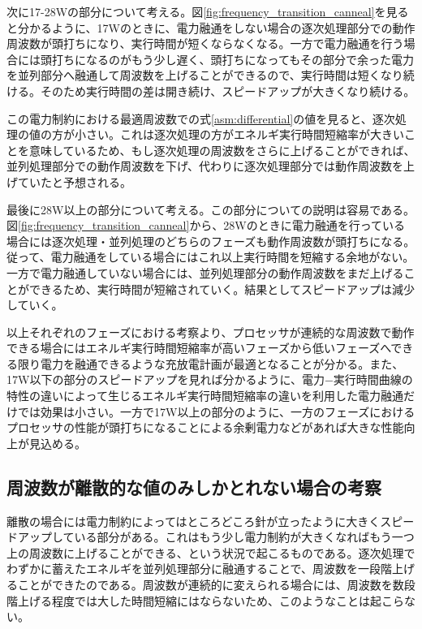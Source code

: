 次に17-28Wの部分について考える。図\ref{fig:frequency_transition_canneal}を見ると分かるように、17Wのときに、電力融通をしない場合の逐次処理部分での動作周波数が頭打ちになり、実行時間が短くならなくなる。一方で電力融通を行う場合には頭打ちになるのがもう少し遅く、頭打ちになってもその部分で余った電力を並列部分へ融通して周波数を上げることができるので、実行時間は短くなり続ける。そのため実行時間の差は開き続け、スピードアップが大きくなり続ける。

この電力制約における最適周波数での式\ref{asm:differential}の値を見ると、逐次処理の値の方が小さい。これは逐次処理の方がエネルギ実行時間短縮率が大きいことを意味しているため、もし逐次処理の周波数をさらに上げることができれば、並列処理部分での動作周波数を下げ、代わりに逐次処理部分では動作周波数を上げていたと予想される。

最後に28W以上の部分について考える。この部分についての説明は容易である。図\ref{fig:frequency_transition_canneal}から、28Wのときに電力融通を行っている場合には逐次処理・並列処理のどちらのフェーズも動作周波数が頭打ちになる。従って、電力融通をしている場合にはこれ以上実行時間を短縮する余地がない。一方で電力融通していない場合には、並列処理部分の動作周波数をまだ上げることができるため、実行時間が短縮されていく。結果としてスピードアップは減少していく。

以上それぞれのフェーズにおける考察より、プロセッサが連続的な周波数で動作できる場合にはエネルギ実行時間短縮率が高いフェーズから低いフェーズへできる限り電力を融通できるような充放電計画が最適となることが分かる。また、17W以下の部分のスピードアップを見れば分かるように、電力−実行時間曲線の特性の違いによって生じるエネルギ実行時間短縮率の違いを利用した電力融通だけでは効果は小さい。一方で17W以上の部分のように、一方のフェーズにおけるプロセッサの性能が頭打ちになることによる余剰電力などがあれば大きな性能向上が見込める。

\subsection{周波数が離散的な値のみしかとれない場合の考察}
\label{subsec:discreet}

離散の場合には電力制約によってはところどころ針が立ったように大きくスピードアップしている部分がある。これはもう少し電力制約が大きくなればもう一つ上の周波数に上げることができる、という状況で起こるものである。逐次処理でわずかに蓄えたエネルギを並列処理部分に融通することで、周波数を一段階上げることができたのである。周波数が連続的に変えられる場合には、周波数を数段階上げる程度では大した時間短縮にはならないため、このようなことは起こらない。

